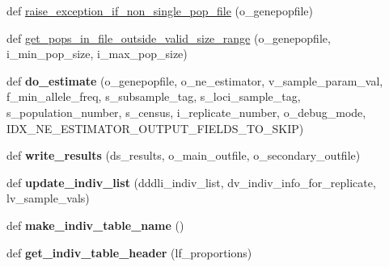 \begin{DoxyCompactItemize}
\item 
def \hyperlink{namespacenegui_1_1pgdriveneestimator_ac98833013f11d6aa3544b0fc60951632}{raise\+\_\+exception\+\_\+if\+\_\+non\+\_\+single\+\_\+pop\+\_\+file} (o\+\_\+genepopfile)
\item 
def \hyperlink{namespacenegui_1_1pgdriveneestimator_ab546af99f06d3ec795da61f806ffafa9}{get\+\_\+pops\+\_\+in\+\_\+file\+\_\+outside\+\_\+valid\+\_\+size\+\_\+range} (o\+\_\+genepopfile, i\+\_\+min\+\_\+pop\+\_\+size, i\+\_\+max\+\_\+pop\+\_\+size)
\item 
def {\bfseries do\+\_\+estimate} (o\+\_\+genepopfile, o\+\_\+ne\+\_\+estimator, v\+\_\+sample\+\_\+param\+\_\+val, f\+\_\+min\+\_\+allele\+\_\+freq, s\+\_\+subsample\+\_\+tag, s\+\_\+loci\+\_\+sample\+\_\+tag, s\+\_\+population\+\_\+number, s\+\_\+census, i\+\_\+replicate\+\_\+number, o\+\_\+debug\+\_\+mode, I\+D\+X\+\_\+\+N\+E\+\_\+\+E\+S\+T\+I\+M\+A\+T\+O\+R\+\_\+\+O\+U\+T\+P\+U\+T\+\_\+\+F\+I\+E\+L\+D\+S\+\_\+\+T\+O\+\_\+\+S\+K\+IP)\hypertarget{namespacenegui_1_1pgdriveneestimator_a081b86aa53c4305557103884132dd478}{}\label{namespacenegui_1_1pgdriveneestimator_a081b86aa53c4305557103884132dd478}

\item 
def {\bfseries write\+\_\+results} (ds\+\_\+results, o\+\_\+main\+\_\+outfile, o\+\_\+secondary\+\_\+outfile)\hypertarget{namespacenegui_1_1pgdriveneestimator_a97bd4891f7343e405094bdf307c7ee89}{}\label{namespacenegui_1_1pgdriveneestimator_a97bd4891f7343e405094bdf307c7ee89}

\item 
def {\bfseries update\+\_\+indiv\+\_\+list} (dddli\+\_\+indiv\+\_\+list, dv\+\_\+indiv\+\_\+info\+\_\+for\+\_\+replicate, lv\+\_\+sample\+\_\+vals)\hypertarget{namespacenegui_1_1pgdriveneestimator_a087de69842dbbb60eaad4e2f692a06c7}{}\label{namespacenegui_1_1pgdriveneestimator_a087de69842dbbb60eaad4e2f692a06c7}

\item 
def {\bfseries make\+\_\+indiv\+\_\+table\+\_\+name} ()\hypertarget{namespacenegui_1_1pgdriveneestimator_aba42585f01bf9ed8468c043e7f05e56a}{}\label{namespacenegui_1_1pgdriveneestimator_aba42585f01bf9ed8468c043e7f05e56a}

\item 
def {\bfseries get\+\_\+indiv\+\_\+table\+\_\+header} (lf\+\_\+proportions)\hypertarget{namespacenegui_1_1pgdriveneestimator_a8ea31f316844b96fb9ba5d9985b16ecc}{}\label{namespacenegui_1_1pgdriveneestimator_a8ea31f316844b96fb9ba5d9985b16ecc}


\end{DoxyCompactItemize}
